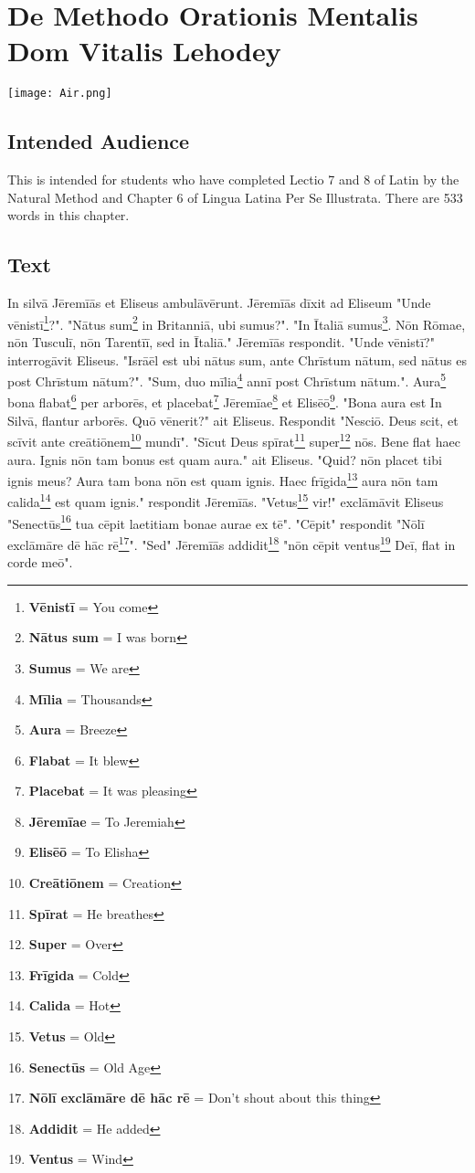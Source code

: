 \chapter{De Methodo Orationis Mentalis Dom Vitalis Lehodey}
\begin{center}
\texttt{[image: Air.png]}
\end{center}

\section{Intended Audience}
This is intended for students who have completed Lectio 7 and 8 of Latin by the Natural Method and Chapter 6 of Lingua Latina Per Se Illustrata. There are 533 words in this chapter.

\section{Text}
In silvā Jēremīās et Eliseus ambulāvērunt. Jēremīās dīxit ad Eliseum "Unde vēnistī\footnote{\textbf{Vēnistī} = You come}?". "Nātus sum\footnote{\textbf{Nātus sum} = I was born} in Britanniā, ubi sumus?". "In Ītaliā sumus\footnote{\textbf{Sumus} = We are}. Nōn Rōmae, nōn Tusculī, nōn Tarentīī, sed in Ītaliā." Jēremīās respondit. "Unde vēnistī?" interrogāvit Eliseus. "Isrāēl est ubi nātus sum, ante Chrīstum nātum, sed nātus es post Chrīstum nātum?". "Sum, duo mīlia\footnote{\textbf{Mīlia} = Thousands} annī post Chrīstum nātum.". Aura\footnote{\textbf{Aura} = Breeze} bona flabat\footnote{\textbf{Flabat} = It blew} per arborēs, et placebat\footnote{\textbf{Placebat} = It was pleasing} Jēremīae\footnote{\textbf{Jēremīae} = To Jeremiah} et Elisēō\footnote{\textbf{Elisēō} = To Elisha}. "Bona aura est In Silvā, flantur arborēs.  Quō vēnerit?" ait Eliseus. Respondit "Nesciō. Deus scit, et scīvit ante creātiōnem\footnote{\textbf{Creātiōnem} = Creation} mundī". "Sīcut Deus spīrat\footnote{\textbf{Spīrat} = He breathes} super\footnote{\textbf{Super} = Over} nōs.  Bene flat haec aura. Ignis nōn tam bonus est quam aura." ait Eliseus. "Quid? nōn placet tibi ignis meus? Aura tam bona nōn est quam ignis. Haec frīgida\footnote{\textbf{Frīgida} = Cold} aura nōn tam calida\footnote{\textbf{Calida} = Hot} est quam ignis." respondit Jēremīās. "Vetus\footnote{\textbf{Vetus} = Old} vir!" exclāmāvit Eliseus "Senectūs\footnote{\textbf{Senectūs} = Old Age} tua cēpit laetitiam bonae aurae ex tē". "Cēpit" respondit "Nōlī exclāmāre dē hāc rē\footnote{\textbf{Nōlī exclāmāre dē hāc rē} = Don't shout about this thing}". "Sed" Jēremīās addidit\footnote{\textbf{Addidit} = He added} "nōn cēpit ventus\footnote{\textbf{Ventus} = Wind} Deī, flat in corde meō". 


